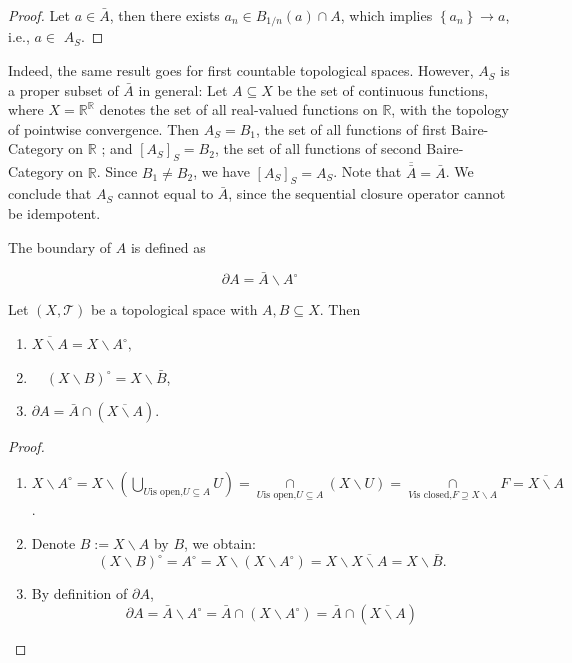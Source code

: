 \begin{example}
\begin{proof}
Let \(a \in  \bar{A}\), then there exists \({a}_{n} \in  {B}_{1/n}\left(a\right)  \cap  A\), which implies \(\left\{  {a}_{n}\right\}   \rightarrow  a\), i.e., \(a \in\)  \({A}_{S}\).
\end{proof}

Indeed, the same result goes for first countable topological spaces. However, \({A}_{S}\) is a proper subset of \(\bar{A}\) in general: Let \(A \subseteq  X\) be the set of continuous functions, where \(X = {\mathbb{R}}^{\mathbb{R}}\) denotes the set of all real-valued functions on \(\mathbb{R}\), with the topology of pointwise convergence. Then \({A}_{S} = B_1\), the set of all functions of first Baire-Category on \(\mathbb{R}\) ; and \({\left\lbrack  {A}_{S}\right\rbrack }_{S} = B_2\), the set of all functions of second Baire-Category on \(\mathbb{R}\). Since \(B_1 \neq  B_2\), we have \({\left\lbrack  {A}_{S}\right\rbrack }_{S} = {A}_{S}\). Note that \(\overline{\bar{A}} = \bar{A}\). We conclude that \({A}_{S}\) cannot equal to \(\bar{A}\), since the sequential closure operator cannot be idempotent.

\begin{definition}[Boundary] The boundary of \(A\) is defined as

\[
\partial A = \bar{A} \smallsetminus  {A}^{\circ}
\]
\end{definition}

\begin{proposition} Let $(X, \mathcal{T})$ be a topological space with \(A,B \subseteq  X\). Then
\begin{enumerate}
    \item $\overline{X \smallsetminus  A} = X \smallsetminus  {A}^{ \circ },$
    \item $\quad{\left(X \smallsetminus  B\right)}^{ \circ } = X \smallsetminus  \bar{B}$,
    \item $\partial A = \bar{A} \cap  \left(\overline{X \smallsetminus  A}\right)$.
\end{enumerate}
\end{proposition}
\begin{proof}
\begin{enumerate}
    \item \(
X \smallsetminus  {A}^{ \circ } = X \smallsetminus  \left({\mathop{\bigcup}\limits_{{U\text{is open,}U \subseteq  A}}U}\right)  
= \mathop{\cap}\limits_{{U\text{is open,}U \subseteq  A}}\left({X \smallsetminus  U}\right)  
= \mathop{\cap}\limits_{{V\text{is closed,}F \supseteq  X \smallsetminus  A}}F 
= \overline{X \smallsetminus  A}\).
\item Denote \(B := X \smallsetminus  A\) by \(B\), we obtain:
\[
{\left(X \smallsetminus  B\right)}^{ \circ } = {A}^{ \circ } 
= X \smallsetminus  \left({X \smallsetminus  {A}^{ \circ }}\right)
= X \smallsetminus  \overline{X \smallsetminus  A} 
= X \smallsetminus  \bar{B}.
\]
\item By definition of \(\partial A\),
\[
\partial A = \bar{A} \smallsetminus  {A}^{ \circ } 
= \bar{A}\cap \left({X \smallsetminus  {A}^{ \circ }}\right)
= \bar{A}\cap \left(\overline{X \smallsetminus  A}\right) 
\]
\end{enumerate}
\end{proof}


\end{example}
